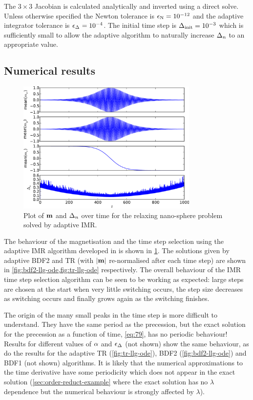 The $3 \times 3$ Jacobian is calculated analytically and inverted using a direct solve.
Unless otherwise specified the Newton tolerance is $\epsilon_{\mathrm{N}} = 10^{-12}$ and the adaptive integrator tolerance is $\epsilon_{\Delta_{}} = 10^{-4}$.
The initial time step is $\Delta_{\mathrm{init}} = 10^{-3}$ which is sufficiently small to allow the adaptive algorithm to naturally increase $\Delta_{n}$ to an appropriate value.


\subsection{Numerical results}
\label{sec:aimr-llgode-numerical-results}

\begin{figure}
  \centering
  \includegraphics[width=0.8\textwidth]{plots/aimr-sphere-relax/imr0-meanmxsvs-meanmysvs-meanmzsvs-dtsvstimes.pdf}
  \caption{Plot of $\boldsymbol{\mathrm{m}}$ and $\Delta_{n}$ over time for the relaxing nano-sphere problem solved by adaptive IMR.}
  \label{fig:imr-llg-ode}
\end{figure}

The behaviour of the magnetisation and the time step selection using the adaptive IMR algorithm developed in  is shown in \cref{fig:imr-llg-ode}.
The solutions given by adaptive BDF2 and TR (with $\left|{\boldsymbol{\mathrm{m}}} \right|$ re-normalised after each time step)  are shown in \cref{fig:bdf2-llg-ode,fig:tr-llg-ode} respectively.
The overall behaviour of the IMR time step selection algorithm can be seen to be working as expected: large steps are chosen at the start when very little switching occurs, the step size decreases as switching occurs and finally grows again as the switching finishes.

The origin of the many small peaks in the time step is more difficult to understand.
They have the same period as the precession, but the exact solution for the precession as a function of time, \cref{eq:79}, has no periodic behaviour!
Results for different values of $\alpha$ and $\epsilon_{\Delta_{}}$ (not shown) show the same behaviour, as do the results for the adaptive TR (\cref{fig:tr-llg-ode}), BDF2 (\cref{fig:bdf2-llg-ode}) and BDF1 (not shown) algorithms.
It is likely that the numerical approximations to the time derivative have some periodicity which does not appear in the exact solution (\cf \cref{sec:order-reduct-example} where the exact solution has no $\lambda$ dependence but the numerical behaviour is strongly affected by $\lambda$).

